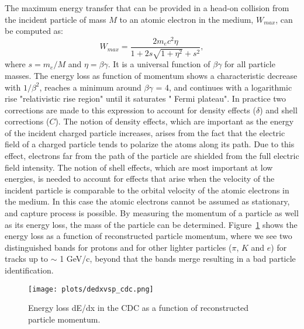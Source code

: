 The maximum energy transfer that can be provided in a head-on collision from the incident particle of mass $M$ to an atomic electron in the medium, $W_{max}$, can be computed as:
\begin{equation}
    \label{eq.3.2}
    W_{max} = \frac{2 m_e c^2 \eta}{1 + 2 s \sqrt{1 + \eta^2} + s^2},
\end{equation}
where $s = m_e/M$ and $\eta = \beta \gamma$.
It is a universal function of $\beta \gamma$ for all particle masses. The energy loss as function of momentum shows a characteristic decrease with $1/\beta^{2}$, reaches a minimum around $\beta \gamma$ = 4, and continues with a logarithmic rise "relativistic rise region" until it saturates " Fermi plateau". In practice two corrections are made to this expression to account for density effects ($\delta$) and shell corrections ($C$). The notion of density effects, which are important as the energy of the incident charged particle increases, arises from the fact that the electric field of a charged particle tends to polarize the atoms along its path. Due to this effect, electrons far from the path of the particle are shielded from the full electric field intensity. The notion of shell effects, which are most important at low energies, is needed to account for effects that arise when the velocity of the incident particle is comparable to the orbital velocity of the atomic electrons in the medium. In this case the atomic electrons cannot be assumed as stationary, and capture process is possible. By measuring the momentum of a particle as well as its energy loss, the mass of the particle can be determined. Figure~\ref{fig.3.1} shows the energy loss as a function of reconstructed particle momentum, where we see two distinguished bands for protons and for other lighter particles ($\pi$, $K$ and $e$) for tracks up to $\sim$ 1 GeV/c, beyond that the bands merge resulting in a bad particle identification.
\begin{figure}[h]
    \centering
    \texttt{[image: plots/dedxvsp\_cdc.png]}
    \caption{\label{fig.3.1}Energy loss dE/dx in the CDC as a function of reconstructed particle momentum.}
\end{figure}

